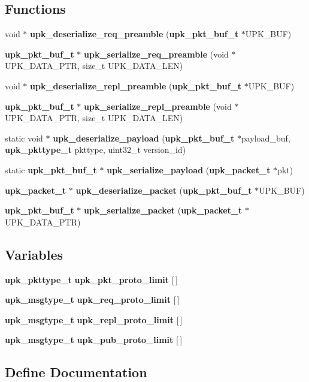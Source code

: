 \subsection*{Functions}
\begin{DoxyCompactItemize}
\item 
void $\ast$ {\bf upk\_\-deserialize\_\-req\_\-preamble} ({\bf upk\_\-pkt\_\-buf\_\-t} $\ast$UPK\_\-BUF)
\item 
{\bf upk\_\-pkt\_\-buf\_\-t} $\ast$ {\bf upk\_\-serialize\_\-req\_\-preamble} (void $\ast$UPK\_\-DATA\_\-PTR, size\_\-t UPK\_\-DATA\_\-LEN)
\item 
void $\ast$ {\bf upk\_\-deserialize\_\-repl\_\-preamble} ({\bf upk\_\-pkt\_\-buf\_\-t} $\ast$UPK\_\-BUF)
\item 
{\bf upk\_\-pkt\_\-buf\_\-t} $\ast$ {\bf upk\_\-serialize\_\-repl\_\-preamble} (void $\ast$UPK\_\-DATA\_\-PTR, size\_\-t UPK\_\-DATA\_\-LEN)
\item 
static void $\ast$ {\bf upk\_\-deserialize\_\-payload} ({\bf upk\_\-pkt\_\-buf\_\-t} $\ast$payload\_\-buf, {\bf upk\_\-pkttype\_\-t} pkttype, uint32\_\-t version\_\-id)
\item 
static {\bf upk\_\-pkt\_\-buf\_\-t} $\ast$ {\bf upk\_\-serialize\_\-payload} ({\bf upk\_\-packet\_\-t} $\ast$pkt)
\item 
{\bf upk\_\-packet\_\-t} $\ast$ {\bf upk\_\-deserialize\_\-packet} ({\bf upk\_\-pkt\_\-buf\_\-t} $\ast$UPK\_\-BUF)
\item 
{\bf upk\_\-pkt\_\-buf\_\-t} $\ast$ {\bf upk\_\-serialize\_\-packet} ({\bf upk\_\-packet\_\-t} $\ast$UPK\_\-DATA\_\-PTR)
\end{DoxyCompactItemize}
\subsection*{Variables}
\begin{DoxyCompactItemize}
\item 
{\bf upk\_\-pkttype\_\-t} {\bf upk\_\-pkt\_\-proto\_\-limit} [$\,$]
\item 
{\bf upk\_\-msgtype\_\-t} {\bf upk\_\-req\_\-proto\_\-limit} [$\,$]
\item 
{\bf upk\_\-msgtype\_\-t} {\bf upk\_\-repl\_\-proto\_\-limit} [$\,$]
\item 
{\bf upk\_\-msgtype\_\-t} {\bf upk\_\-pub\_\-proto\_\-limit} [$\,$]
\end{DoxyCompactItemize}


\subsection{Define Documentation}

